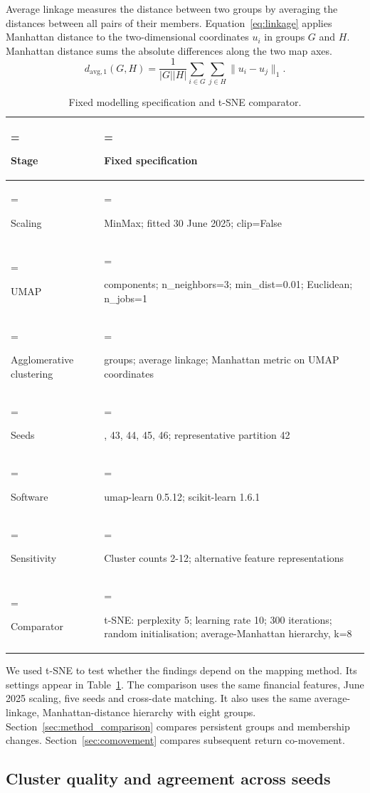 Average linkage measures the distance between two groups by averaging the distances between all pairs of their members. Equation~\ref{eq:linkage} applies Manhattan distance to the two-dimensional coordinates $u_i$ in groups $G$ and $H$. Manhattan distance sums the absolute differences along the two map axes.
\begin{equation}
d_{\mathrm{avg},1}(G,H)=\frac{1}{|G||H|}\sum_{i\in G}\sum_{j\in H}\|u_i-u_j\|_1.
\label{eq:linkage}\end{equation}

\begin{table}[htbp]
\centering\caption{Fixed modelling specification and t-SNE comparator.}\label{tab:3}
\footnotesize
\begin{tabularx}{\linewidth}{@{}>{\hsize=0.500\hsize\linewidth=\hsize\raggedright\arraybackslash}X >{\hsize=1.500\hsize\linewidth=\hsize\raggedright\arraybackslash}X@{}}
\toprule
Stage & Fixed specification \\
\midrule
Scaling & MinMax; fitted 30 June 2025; clip=False \\
UMAP & 2 components; n\_neighbors=3; min\_dist=0.01; Euclidean; n\_jobs=1 \\
Agglomerative clustering & 8 groups; average linkage; Manhattan metric on UMAP coordinates \\
Seeds & 42, 43, 44, 45, 46; representative partition 42 \\
Software & umap-learn 0.5.12; scikit-learn 1.6.1 \\
Sensitivity & Cluster counts 2-12; alternative feature representations \\
Comparator & t-SNE: perplexity 5; learning rate 10; 300 iterations; random initialisation; average-Manhattan hierarchy, k=8 \\
\bottomrule
\end{tabularx}
\end{table}


We used t-SNE to test whether the findings depend on the mapping method. Its settings appear in Table~\ref{tab:3}. The comparison uses the same financial features, June 2025 scaling, five seeds and cross-date matching. It also uses the same average-linkage, Manhattan-distance hierarchy with eight groups. Section~\ref{sec:method_comparison} compares persistent groups and membership changes. Section~\ref{sec:comovement} compares subsequent return co-movement.

\subsection{Cluster quality and agreement across seeds}

